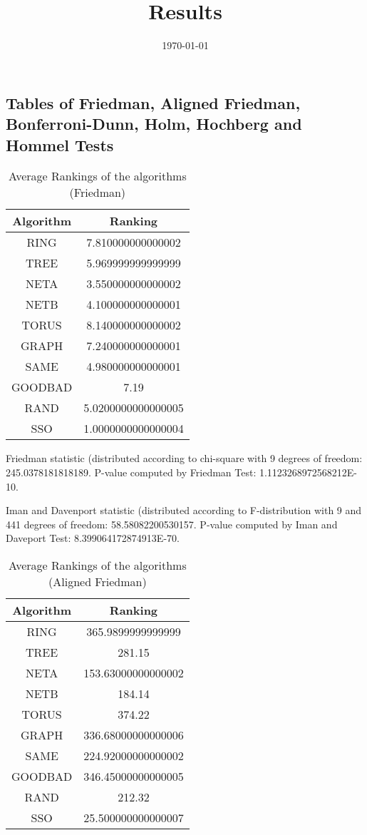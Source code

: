 \documentclass[a4paper,10pt]{article}
\title{Results}
\author{}
\date{\today}
\begin{document}
\begin{landscape}
\oddsidemargin 0in \topmargin 0in\maketitle
\section{Tables of Friedman, Aligned Friedman, Bonferroni-Dunn, Holm, Hochberg and Hommel Tests}
\begin{table}[!htp]
\centering
\caption{Average Rankings of the algorithms (Friedman)
}\begin{tabular}{c|c}
Algorithm&Ranking\\
\hline
 RING&7.810000000000002\\
 TREE&5.969999999999999\\
 NETA&3.550000000000002\\
 NETB&4.100000000000001\\
 TORUS&8.140000000000002\\
 GRAPH&7.240000000000001\\
 SAME&4.980000000000001\\
 GOODBAD&7.19\\
 RAND&5.0200000000000005\\
 SSO&1.0000000000000004\\
\end{tabular}
\end{table}


Friedman statistic (distributed according to chi-square with 9 degrees of freedom: 245.0378181818189. 
P-value computed by Friedman Test: 1.1123268972568212E-10.\newline

Iman and Davenport statistic (distributed according to F-distribution with 9 and 441 degrees of freedom: 58.58082200530157. 
P-value computed by Iman and Daveport Test: 8.399064172874913E-70.\newline


\newpage

\begin{table}[!htp]
\centering
\caption{Average Rankings of the algorithms (Aligned Friedman)
}\begin{tabular}{c|c}
Algorithm&Ranking\\
\hline
 RING&365.9899999999999\\
 TREE&281.15\\
 NETA&153.63000000000002\\
 NETB&184.14\\
 TORUS&374.22\\
 GRAPH&336.68000000000006\\
 SAME&224.92000000000002\\
 GOODBAD&346.45000000000005\\
 RAND&212.32\\
 SSO&25.500000000000007\\
\end{tabular}
\end{table}



\end{landscape}
\end{document}
